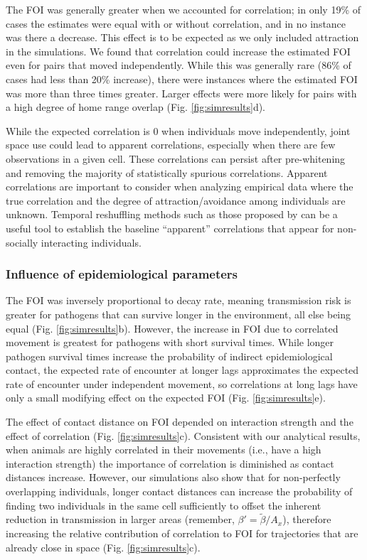 \documentclass[letterpaper]{article}
\begin{document}

The FOI was generally greater when we accounted for correlation; in only 19\% of cases the estimates were equal with or without correlation, and in no instance was there a decrease. This effect is to be expected as we only included attraction in the simulations. 
We found that correlation could increase the estimated FOI even for pairs that moved independently. While this was generally rare (86\% of cases had less than 20\% increase),
there were  instances where the estimated FOI was more than three times greater. Larger effects were more likely for pairs with a high degree of home range overlap (Fig. \ref{fig:simresults}d). 

While the expected correlation is 0 when individuals move independently, joint space use could lead to apparent correlations, especially when there are few observations in a given cell. These correlations can persist after pre-whitening and removing the majority of statistically spurious correlations. Apparent correlations are important to consider when analyzing empirical data where the true correlation and the degree of attraction/avoidance among individuals are unknown. Temporal reshuffling methods such as those proposed by \citet{Spiegel2016} can be a useful tool to establish the baseline ``apparent'' correlations that appear for non-socially interacting individuals.

\subsubsection*{Influence of epidemiological parameters}

The FOI was inversely proportional to decay rate, meaning transmission risk is greater for pathogens that can survive longer in the environment, all else being equal (Fig. \ref{fig:simresults}b).
However, the increase in FOI due to correlated movement is greatest for pathogens with short survival times. While longer pathogen survival times increase the probability of indirect epidemiological contact, the expected rate of encounter at longer lags approximates the expected rate of encounter under independent movement, so correlations at long lags have only a small modifying effect on the expected FOI (Fig. \ref{fig:simresults}e). 

The effect of contact distance on FOI depended on interaction strength and the effect of correlation (Fig. \ref{fig:simresults}c). Consistent with our analytical results, when animals are highly correlated in their movements (i.e., have a high interaction strength) the importance of correlation is diminished as contact distances increase.
However, our simulations also show that for non-perfectly overlapping individuals, longer contact distances can increase the probability of finding two individuals in the same cell sufficiently to offset the inherent reduction in transmission in larger areas (remember, $\beta' = \tilde{\beta} / A_x$), therefore increasing the relative contribution of correlation to FOI for trajectories that are already close in space (Fig. \ref{fig:simresults}c).
\end{document}
